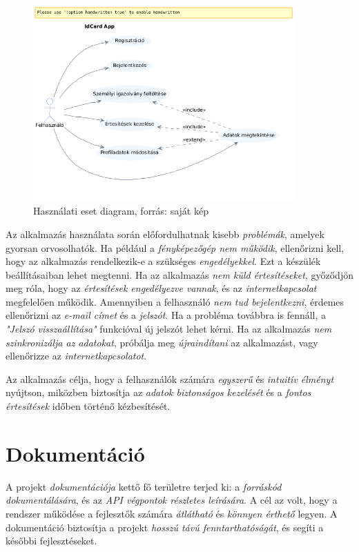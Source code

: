 \documentclass[
]{thesis-ekf}
\theoremstyle{definition}
\theoremstyle{remark}
\begin{document}
\begin{figure} \centering \includegraphics[width=10cm]{usecase} \caption{Használati eset diagram, forrás: saját kép} \label{fig-usecase} \end{figure}

Az alkalmazás használata során előfordulhatnak kisebb \emph{problémák}, amelyek gyorsan orvosolhatók. Ha például a \emph{fényképezőgép nem működik}, ellenőrizni kell, hogy az alkalmazás rendelkezik-e a szükséges \emph{engedélyekkel}. Ezt a készülék beállításaiban lehet megtenni. Ha az alkalmazás \emph{nem küld értesítéseket}, győződjön meg róla, hogy az \emph{értesítések engedélyezve vannak}, és az \emph{internetkapcsolat} megfelelően működik. Amennyiben a felhasználó \emph{nem tud bejelentkezni}, érdemes ellenőrizni az \emph{e-mail címet} és a \emph{jelszót}. Ha a probléma továbbra is fennáll, a \emph{"Jelszó visszaállítása"} funkcióval új jelszót lehet kérni. Ha az alkalmazás \emph{nem szinkronizálja az adatokat}, próbálja meg \emph{újraindítani} az alkalmazást, vagy ellenőrizze az \emph{internetkapcsolatot}.

Az alkalmazás célja, hogy a felhasználók számára \emph{egyszerű} és \emph{intuitív élményt} nyújtson, miközben biztosítja az \emph{adatok biztonságos kezelését} és a \emph{fontos értesítések} időben történő kézbesítését.

\section{Dokumentáció}

A projekt \emph{dokumentációja} kettő fő területre terjed ki: a \emph{forráskód dokumentálására}, és az \emph{API végpontok részletes leírására}. A cél az volt, hogy a rendszer működése a fejlesztők számára \emph{átlátható} és \emph{könnyen érthető} legyen. A dokumentáció biztosítja a projekt \emph{hosszú távú fenntarthatóságát}, és segíti a későbbi fejlesztéseket.
\end{document}
